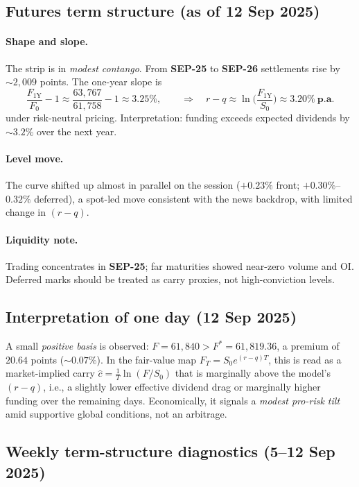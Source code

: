 \documentclass[11pt,a4paper]{article} %
\begin{document}
\subsection{Futures term structure (as of 12 Sep 2025)}
\paragraph{Shape and slope.}
The strip is in \emph{modest contango}. From \textbf{SEP-25} to \textbf{SEP-26} settlements rise by \(\sim 2{,}009\) points. The one-year slope is
\[
\frac{F_{1\mathrm{Y}}}{F_{0}}-1 \approx \frac{63{,}767}{61{,}758}-1 \approx \mathbf{3.25\%},
\qquad
\Rightarrow\quad r-q \approx \ln\!\Big(\frac{F_{1\mathrm{Y}}}{S_0}\Big)\approx \mathbf{3.20\%\ \text{p.a.}}
\]
under risk-neutral pricing. Interpretation: funding exceeds expected dividends by \(\sim 3.2\%\) over the next year.

\paragraph{Level move.}
The curve shifted up almost in parallel on the session (\(+0.23\%\) front; \(+0.30\%\)–\(0.32\%\) deferred), a spot-led move consistent with the news backdrop, with limited change in \((r-q)\).

\paragraph{Liquidity note.}
Trading concentrates in \textbf{SEP-25}; far maturities showed near-zero volume and OI. Deferred marks should be treated as carry proxies, not high-conviction levels.

\subsection{Interpretation of one day (12 Sep 2025)}
A small \emph{positive basis} is observed: \(F=61{,}840>F^{*}=61{,}819.36\), a premium of \(20.64\) points (\(\sim \mathbf{0.07\%}\)). In the fair-value map \(F_T=S_0 e^{(r-q)T}\), this is read as a market-implied carry \(\hat c=\frac{1}{T}\ln(F/S_0)\) that is marginally above the model’s \((r-q)\), i.e., a slightly lower effective dividend drag or marginally higher funding over the remaining days. Economically, it signals a \emph{modest pro-risk tilt} amid supportive global conditions, not an arbitrage.

\subsection{Weekly term-structure diagnostics (5–12 Sep 2025)}
\end{document}
